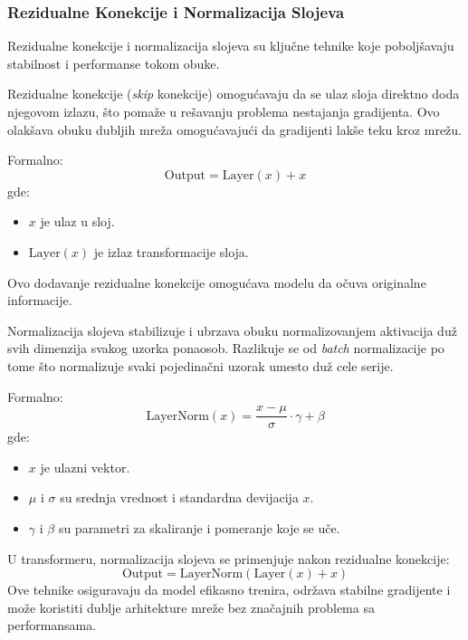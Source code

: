 \documentclass[12pt]{article}
\begin{document}
   \subsubsection*{Rezidualne Konekcije i Normalizacija Slojeva}

   Rezidualne konekcije i normalizacija slojeva su ključne tehnike koje poboljšavaju 
   stabilnost i performanse tokom obuke.

   Rezidualne konekcije (\textit{skip} konekcije) omogućavaju da se ulaz sloja direktno 
   doda njegovom izlazu, što pomaže u rešavanju problema nestajanja gradijenta. Ovo 
   olakšava obuku dubljih mreža omogućavajući da gradijenti lakše teku kroz mrežu.

   Formalno:
   \[
   \text{Output} = \text{Layer}(x) + x
   \]
   gde:
   \begin{itemize}
      \vspace{-0.5cm}
      \item \( x \) je ulaz u sloj.
      \item \( \text{Layer}(x) \) je izlaz transformacije sloja.
   \end{itemize}

   Ovo dodavanje rezidualne konekcije omogućava modelu da očuva originalne informacije.
   
   Normalizacija slojeva stabilizuje i ubrzava obuku normalizovanjem aktivacija duž 
   svih dimenzija svakog uzorka ponaosob. Razlikuje se od \textit{batch} normalizacije po 
   tome što normalizuje svaki pojedinačni uzorak umesto duž cele serije.

   Formalno:
   \[
   \text{LayerNorm}(x) = \frac{x - \mu}{\sigma} \cdot \gamma + \beta
   \]
   gde:
   \begin{itemize}
      \vspace{-0.5cm}
      \setlength\itemsep{0.2em} %
      \item \( x \) je ulazni vektor.
      \item \( \mu \) i \( \sigma \) su srednja vrednost i standardna devijacija \( x \).
      \item \( \gamma \) i \( \beta \) su parametri za skaliranje i pomeranje koje se uče.
   \end{itemize}

   U transformeru, normalizacija slojeva se primenjuje nakon rezidualne konekcije:
   \[
   \text{Output} = \text{LayerNorm}(\text{Layer}(x) + x)
   \]  
   Ove tehnike osiguravaju da model efikasno trenira, održava stabilne gradijente i 
   može koristiti dublje arhitekture mreže bez značajnih problema sa performansama.
\end{document}
